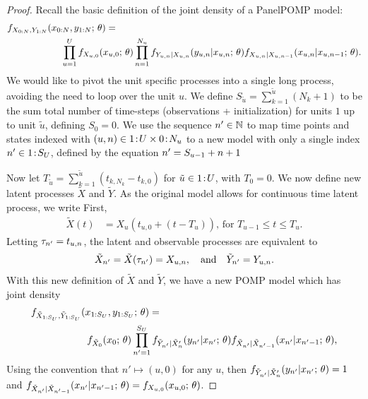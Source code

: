 \documentclass[12pt]{article}\usepackage[]{graphicx}\usepackage[]{xcolor}
\begin{document}
\begin{appendices}
  \begin{proof}
  Recall the basic definition of the joint density of a PanelPOMP model:
  \begin{align}
&f_{X_{0:N}, Y_{1:N}}(x_{0:N}, y_{1:N}; \, \theta) =
\nonumber
\\
& \hspace{20mm} \prod_{u = 1}^Uf_{X_{u, 0}}(x_{u, 0};\, \theta)
\prod_{n = 1}^{N_u}f_{Y_{u, n}|X_{u, n}}(y_{u, n} | x_{u, n} ;\, \theta)f_{X_{u, n} | X_{u, n-1}}(x_{u, n}|x_{u, n-1}; \, \theta). \label{eq:ppompSI}
\end{align}
  We would like to pivot the unit specific processes into a single long process, avoiding the need to loop over the unit $u$.
  We define $S_{\tilde{u}} = \sum_{k = 1}^{\tilde{u}}(N_k + 1)$ to be the sum total number of time-steps (observations + initialization) for units $1$ up to unit $\tilde{u}$, defining $S_0 = 0$.
  We use the sequence $n' \in \mathbb{N}$ to map time points and states indexed with $(u, n) \in {1}\!:\!{U}\times{0}\!:\!{N_u}$ to a new model with only a single index $n' \in {1}\!:\!{S_U}$, defined by the equation $n' = S_{u-1} + n + 1$

  Now let $T_{\tilde{u}} = \sum_{k = 1}^{\tilde{u}} (t_{k, N_k} - t_{k, 0})$ for $\tilde{u} \in {1}\!:\!{U}$, with $T_0 = 0$.
  We now define new latent processes $\tilde{X}$ and $\tilde{Y}$. As the original model allows for continuous time latent process, we write
  First,
  \begin{align}
    \tilde{X}(t) &= X_u(t_{u, 0} + (t - T_u)), \, \text{for} \,\, T_{u-1} \leq t \leq T_u.
  \end{align}
  Letting $\tau_{n'} = t_{u, n}$, the latent and observable processes are equivalent to
  \begin{align*}
    \tilde{X}_{n'} = \tilde{X}(\tau_{n'}) = X_{u, n}, \quad \text{and} \quad \tilde{Y}_{n'} = Y_{u, n}.
  \end{align*}
  With this new definition of $\tilde{X}$ and $\tilde{Y}$, we have a new POMP model which has joint density
  \begin{align}
&f_{\tilde{X}_{1:S_U}, \tilde{Y}_{1:S_U}}(x_{1:S_U}, y_{1:S_U}; \, \theta) =  \nonumber
\\
& \hspace{20mm}
f_{\tilde{X}_0}(x_0;\, \theta)\prod_{\nstack = 1}^{S_{U}}f_{\tilde{Y}_{\nstack}|\tilde{X}_\nstack}(y_{\nstack} | x_{\nstack}; \, \theta)f_{\tilde{X}_{\nstack}|\tilde{X}_{\nstack - 1}}(x_{\nstack} | x_{\nstack - 1}; \, \theta), \label{eq:lowPOMP}
  \end{align}
  Using the convention that $n' \mapsto (u,0)$ for any $u$, then $f_{\tilde{Y}_{n'}|\tilde{X}_n'}(y_{n'} | x_{n'}; \, \theta) = 1$ and \linebreak $f_{\tilde{X}_{n'}|\tilde{X}_{n' - 1}}(x_{n'} | x_{n' - 1}; \, \theta) = f_{X_{u, 0}}(x_{u, 0}; \, \theta)$.


\end{proof}
\end{appendices}
\end{document}
